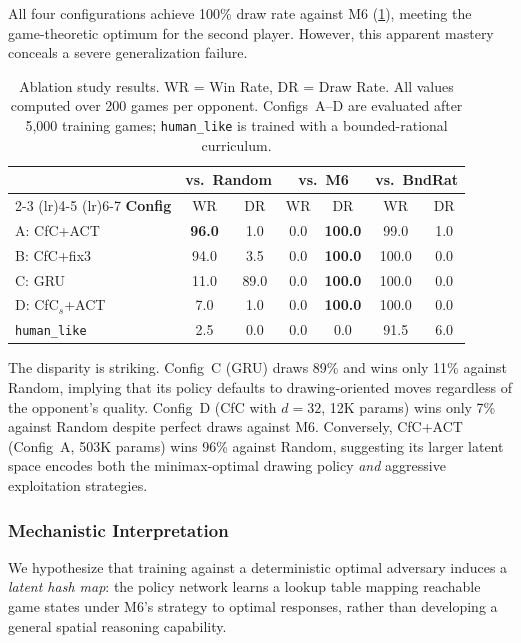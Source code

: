 \documentclass[conference]{IEEEtran}
\begin{document}
All four configurations achieve 100\% draw rate against M6 (\cref{tab:ablation}), meeting the game-theoretic optimum for the second player. However, this apparent mastery conceals a severe generalization failure.

\begin{table}[t]
\centering
\caption{Ablation study results. WR = Win Rate, DR = Draw Rate. All values computed over 200 games per opponent. Configs~A--D are evaluated after 5{,}000 training games; \texttt{human\_like} is trained with a bounded-rational curriculum.}
\label{tab:ablation}
\setlength{\tabcolsep}{3.5pt}
\begin{tabular}{@{}l cc cc cc@{}}
\toprule
 & \multicolumn{2}{c}{\textbf{vs.\ Random}} & \multicolumn{2}{c}{\textbf{vs.\ M6}} & \multicolumn{2}{c}{\textbf{vs.\ BndRat}} \\
\cmidrule(lr){2-3} \cmidrule(lr){4-5} \cmidrule(lr){6-7}
\textbf{Config} & WR & DR & WR & DR & WR & DR \\
\midrule
A: CfC+ACT     & \textbf{96.0} & 1.0  & 0.0 & \textbf{100.0} & 99.0 & 1.0 \\
B: CfC+fix3    & 94.0 & 3.5  & 0.0 & \textbf{100.0} & 100.0 & 0.0 \\
C: GRU         & 11.0 & 89.0 & 0.0 & \textbf{100.0} & 100.0 & 0.0 \\
D: CfC$_s$+ACT & 7.0  & 1.0  & 0.0 & \textbf{100.0} & 100.0 & 0.0 \\
\texttt{human\_like}    & 2.5  & 0.0  & 0.0 & 0.0            & 91.5  & 6.0 \\
\bottomrule
\end{tabular}
\end{table}

The disparity is striking. Config~C (GRU) draws 89\% and wins only 11\% against Random, implying that its policy defaults to drawing-oriented moves regardless of the opponent's quality. Config~D (CfC with $d=32$, 12K params) wins only 7\% against Random despite perfect draws against M6. Conversely, CfC+ACT (Config~A, 503K params) wins 96\% against Random, suggesting its larger latent space encodes both the minimax-optimal drawing policy \emph{and} aggressive exploitation strategies.

\subsubsection{Mechanistic Interpretation}
\label{sssec:mechanism}

We hypothesize that training against a deterministic optimal adversary induces a \emph{latent hash map}: the policy network learns a lookup table mapping reachable game states under M6's strategy to optimal responses, rather than developing a general spatial reasoning capability.
\end{document}
